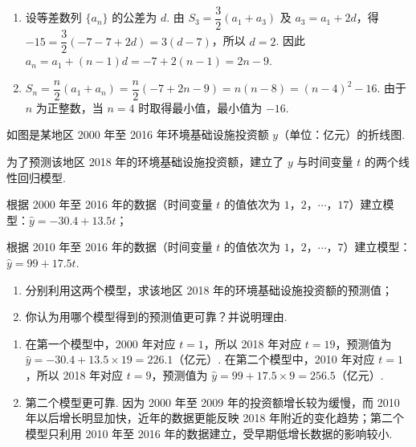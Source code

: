 \begin{solution}
\begin{enumerate}
\item 设等差数列 \(\{a_n\}\) 的公差为 \(d\). 由 \(S_3=\dfrac32(a_1+a_3)\) 及 \(a_3=a_1+2d\)，得
\( -15=\dfrac32(-7-7+2d)=3(d-7)\)，所以 \(d=2\). 因此 \(a_n=a_1+(n-1)d=-7+2(n-1)=2n-9\).
\item \(S_n=\dfrac n2(a_1+a_n)=\dfrac n2(-7+2n-9)=n(n-8)=(n-4)^2-16\). 由于 \(n\) 为正整数，当 \(n=4\) 时取得最小值，最小值为 \(-16\).
\end{enumerate}
\end{solution}

\begin{problem}
如图是某地区 2000 年至 2016 年环境基础设施投资额 \(y\)（单位：亿元）的折线图.

为了预测该地区 2018 年的环境基础设施投资额，建立了 \(y\) 与时间变量 \(t\) 的两个线性回归模型.

\begin{circlelist}
\item 根据 2000 年至 2016 年的数据（时间变量 \(t\) 的值依次为 \(1\)，\(2\)，\(\cdots\)，\(17\)）建立模型：\(\hat y=-30.4+13.5t\)；
\item 根据 2010 年至 2016 年的数据（时间变量 \(t\) 的值依次为 \(1\)，\(2\)，\(\cdots\)，\(7\)）建立模型：\(\hat y=99+17.5t\).
\end{circlelist}

\begin{enumerate}
    \item 分别利用这两个模型，求该地区 2018 年的环境基础设施投资额的预测值；
    \item 你认为用哪个模型得到的预测值更可靠？并说明理由.
\end{enumerate}

\begingroup
\setlength{\leftskip}{0pt}%
\endgroup
\end{problem}

\begin{solution}
\begin{enumerate}
\item 在第一个模型中，2000 年对应 \(t=1\)，所以 2018 年对应 \(t=19\)，预测值为 \(\hat y=-30.4+13.5\times19=226.1\)（亿元）. 在第二个模型中，2010 年对应 \(t=1\)，所以 2018 年对应 \(t=9\)，预测值为 \(\hat y=99+17.5\times9=256.5\)（亿元）.
\item 第二个模型更可靠. 因为 2000 年至 2009 年的投资额增长较为缓慢，而 2010 年以后增长明显加快，近年的数据更能反映 2018 年附近的变化趋势；第二个模型只利用 2010 年至 2016 年的数据建立，受早期低增长数据的影响较小.
\end{enumerate}
\end{solution}


